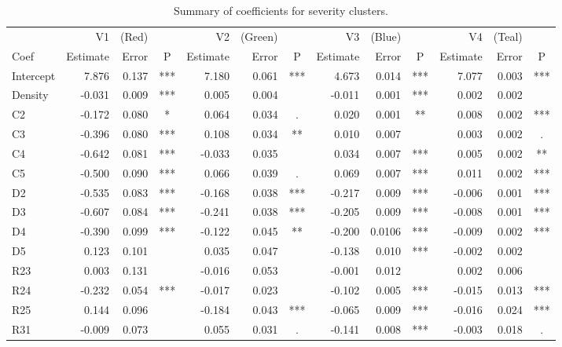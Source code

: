 \documentclass[11pt,letterpaper]{article}
\numberwithin{equation}{section}
\numberwithin{equation}{section}
\numberwithin{equation}{section}
\begin{document}
\begin{center}
\begin{table}
\caption{Summary of coefficients for severity clusters.}
\label{severity_coef_table}
\begin{tabular}{|l|rrc|rrc|rrc|rrc|}
\hline\hline
         & V1         & (Red)     &    & V2         & (Green)   &    & V3          & (Blue)     &    & V4          & (Teal)     &    \\
Coef      & Estimate   & Error     & P   & Estimate   & Error     & P   & Estimate    & Error      & P   & Estimate    & Error      & P   \\ \hline
Intercept & 7.876  & 0.137 & *** & 7.180  & 0.061 & *** & 4.673   & 0.014 & *** & 7.077  & 0.003 & *** \\
Density   & -0.031 & 0.009 & *** & 0.005  & 0.004 &     & -0.011 & 0.001 & *** & 0.002  & 0.002 &     \\
C2        & -0.172 & 0.080 & *   & 0.064  & 0.034 & .   & 0.020 & 0.001 & **  & 0.008  & 0.002 & *** \\
C3        & -0.396 & 0.080 & *** & 0.108  & 0.034 & **  & 0.010  & 0.007 &     & 0.003  & 0.002 & .   \\
C4        & -0.642 & 0.081 & *** & -0.033 & 0.035 &     & 0.034  & 0.007 & *** & 0.005  & 0.002 & **  \\
C5        & -0.500 & 0.090 & *** & 0.066 & 0.039 & .   & 0.069  & 0.007 & *** & 0.011  & 0.002 & *** \\
D2        & -0.535 & 0.083 & *** & -0.168 & 0.038 & *** & -0.217 & 0.009 & *** & -0.006 & 0.001 & *** \\
D3        & -0.607  & 0.084 & *** & -0.241 & 0.038 & *** & -0.205 & 0.009 & *** & -0.008 & 0.001 & *** \\
D4        & -0.390 & 0.099 & *** & -0.122 & 0.045 & **  & -0.200 & 0.0106 & *** & -0.009  & 0.002 & *** \\
D5        & 0.123 & 0.101 &     & 0.035  & 0.047 &     & -0.138 & 0.010 & *** & -0.002 & 0.002 &     \\
R23       & 0.003 & 0.131  &     & -0.016 & 0.053 &     & -0.001 & 0.012 &     & 0.002  & 0.006 &     \\
R24       & -0.232 & 0.054 & *** & -0.017 & 0.023 &     & -0.102 & 0.005 & *** & -0.015 & 0.013 & *** \\
R25       & 0.144  & 0.096 &     & -0.184 & 0.043 & *** & -0.065 & 0.009 & *** & -0.016 & 0.024 & *** \\
R31       & -0.009 & 0.073 &     & 0.055  & 0.031 & .   & -0.141 & 0.008 & *** & -0.003 & 0.018 & .   \\

\end{tabular}
\end{table}
\end{center}
\end{document}
